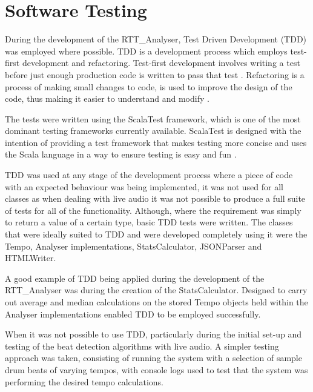 \documentclass[a4paper, 11pt]{article}
\begin{document}
\maketitle{}\section{Software Testing}
During the development of the RTT\_Analyser, Test Driven Development (TDD) was employed where possible. TDD is a development process which employs test-first development and refactoring. Test-first development involves writing a test before just enough production code is written to pass that test \cite{tdd1}. Refactoring is a process of making small changes to code, is used to improve the design of the code, thus making it easier to understand and modify \cite{tdd2}. \par

The tests were written using the ScalaTest framework, which is one of the most dominant testing frameworks currently available. ScalaTest is designed with the intention of providing a test framework that makes testing more concise and uses the Scala language in a way to ensure testing is easy and fun \cite{testingScala}.

TDD was used at any stage of the development process where a piece of code with an expected behaviour was being implemented, it was not used for all classes as when dealing with live audio it was not possible to produce a full suite of tests for all of the functionality. Although, where the requirement was simply to return a value of a certain type, basic TDD tests were written. The classes that were ideally suited to TDD and were developed completely using it were the Tempo, Analyser implementations, StatsCalculator, JSONParser and HTMLWriter. \par

A good example of TDD being applied during the development of the RTT\_Analyser was during the creation of the StatsCalculator. Designed to carry out average and median calculations on the stored Tempo objects held within the Analyser implementations enabled TDD to be employed successfully.

When it was not possible to use TDD, particularly during the initial set-up and testing of the beat detection algorithms with live audio. A simpler testing approach was taken, consisting of running the system with a selection of sample drum beats of varying tempos, with console logs used to test that the system was performing the desired tempo calculations.
\end{document}

